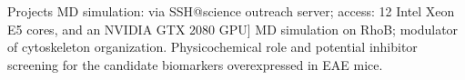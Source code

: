 
\begin{rubric}{Projects}
    \noentry{}
    \entry*[2022]
        MD simulation: via SSH@science outreach server; access: 12 Intel Xeon E5 cores, and an NVIDIA GTX 2080 GPU]
    \entry*[2022]
        MD simulation on RhoB; modulator of cytoskeleton organization.
    \entry*[2021]
        Physicochemical role and potential inhibitor screening for the candidate biomarkers overexpressed in EAE mice.
\end{rubric}
    